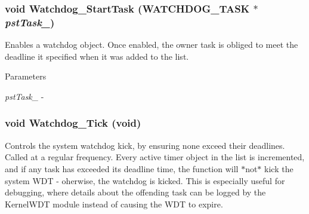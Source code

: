 \subsubsection[{Watchdog\_\-StartTask}]{\setlength{\rightskip}{0pt plus 5cm}void Watchdog\_\-StartTask ({\bf WATCHDOG\_\-TASK} $\ast$ {\em pstTask\_\-})}\label{watchdog_8c_ad92eafd2e2e876c85cdd6bcf755e8efb}
Enables a watchdog object. Once enabled, the owner task is obliged to meet the deadline it specified when it was added to the list.


\begin{DoxyParams}{Parameters}
\item[{\em pstTask\_\-}]-\/ \end{DoxyParams}
\subsubsection[{Watchdog\_\-Tick}]{\setlength{\rightskip}{0pt plus 5cm}void Watchdog\_\-Tick (void)}\label{watchdog_8c_a85a9918ed38b9f7cd62cc9224cf1b583}
Controls the system watchdog kick, by ensuring none exceed their deadlines. Called at a regular frequency. Every active timer object in the list is incremented, and if any task has exceeded its deadline time, the function will $\ast$not$\ast$ kick the system WDT -\/ oherwise, the watchdog is kicked. This is especially useful for debugging, where details about the offending task can be logged by the KernelWDT module instead of causing the WDT to expire. 